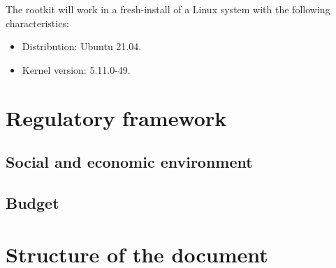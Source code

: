 \documentclass[12pt]{report} %
\begin{document}
The rootkit will work in a fresh-install of a Linux system with the following characteristics:
\begin{itemize}
\item Distribution: Ubuntu 21.04.
\item Kernel version: 5.11.0-49.
\end{itemize} 

\section{Regulatory framework}


\subsection{Social and economic environment}


\subsection{Budget}

\section{Structure of the document}


%
\end{document}
